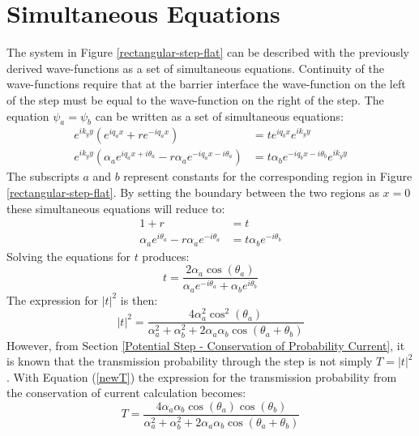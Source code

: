 		\section{Simultaneous Equations}
		\label{Potential Step - Simultaneous Equations}
		The system in Figure \ref{rectangular-step-flat} can be described with the previously derived wave-functions as a set of simultaneous equations. Continuity of the wave-functions require that at the barrier interface the wave-function on the left of the step must be equal to the wave-function on the right of the step. The equation $\psi_{a}=\psi_{b}$ can be written as a set of simultaneous equations:
		\begin{align}
			e^{ik_{y}y}\left(e^{iq_{a}x}+re^{-iq_{a}x}\right)&=te^{iq_{b}x}e^{ik_{y}y}\\
			e^{ik_{y}y}\left(\alpha_{a}e^{iq_{a}x+i\theta_{a}}-r\alpha_{a}e^{-iq_{a}x-i\theta_{a}}\right)&=t\alpha_{b}e^{-iq_{b}x-i\theta_{b}}e^{ik_{y}y}
		\end{align}
		The subscripts $a$ and $b$ represent constants for the corresponding region in Figure \ref{rectangular-step-flat}. By setting the boundary between the two regions as $x=0$ these simultaneous equations will reduce to:
		\begin{align}
			1+r&=t\\
			\alpha_{a}e^{i\theta_{a}}-r\alpha_{a}e^{-i\theta_{a}}&=t\alpha_{b}e^{-i\theta_{b}}
		\end{align}
		Solving the equations for $t$ produces:
		\begin{equation}
			t=\frac{2\alpha_{a}\cos(\theta_{a})}{\alpha_{a}e^{-i\theta_{a}}+\alpha_{b}e^{i\theta_{b}}}
		\end{equation}
		The expression for $|t|^{2}$ is then:
		\begin{equation}
			|t|^{2}=\frac{4\alpha_{a}^{2}\cos^{2}(\theta_{a})}{\alpha_{a}^{2}+\alpha_{b}^{2}+2\alpha_{a}\alpha_{b}\cos(\theta_{a}+\theta_{b})}
		\end{equation}
		However, from Section \ref{Potential Step - Conservation of Probability Current}, it is known that the transmission probability through the step is not simply $T=|t|^{2}$. With Equation (\ref{newT}) the expression for the transmission probability from the conservation of current calculation becomes:
		\begin{equation}
			T=\frac{4\alpha_{a}\alpha_{b}\cos(\theta_{a})\cos(\theta_{b})}{\alpha_{a}^{2}+\alpha_{b}^{2}+2\alpha_{a}\alpha_{b}\cos(\theta_{a}+\theta_{b})}
		\end{equation}

